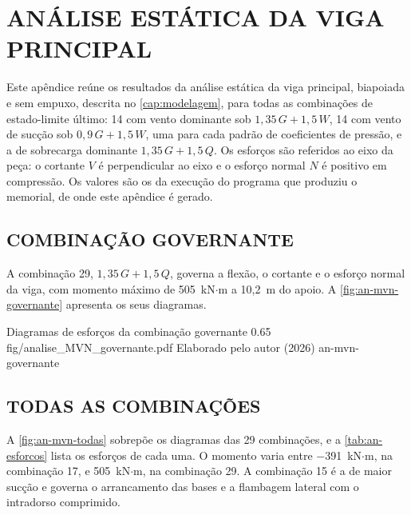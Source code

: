 
\chapter{ANÁLISE ESTÁTICA DA VIGA PRINCIPAL}\label{ap:analise-estatica}

Este apêndice reúne os resultados da análise estática da viga principal, biapoiada e sem empuxo, descrita no \autoref{cap:modelagem}, para todas as combinações de estado-limite último: 14 com vento dominante sob $1{,}35\,G + 1{,}5\,W$, 14 com vento de sucção sob $0{,}9\,G + 1{,}5\,W$, uma para cada padrão de coeficientes de pressão, e a de sobrecarga dominante $1{,}35\,G + 1{,}5\,Q$. Os esforços são referidos ao eixo da peça: o cortante $V$ é perpendicular ao eixo e o esforço normal $N$ é positivo em compressão. Os valores são os da execução do programa que produziu o memorial, de onde este apêndice é gerado.

\section{COMBINAÇÃO GOVERNANTE}\label{sec:an-governante}

A combinação 29, $1{,}35\,G + 1{,}5\,Q$, governa a flexão, o cortante e o esforço normal da viga, com momento máximo de 505~kN$\cdot$m a 10,2~m do apoio. A \autoref{fig:an-mvn-governante} apresenta os seus diagramas.

\figura
{Diagramas de esforços da combinação governante}
{0.65}
{fig/analise_MVN_governante.pdf}
{Elaborado pelo autor (2026)}
{an-mvn-governante}
{}
{}

\section{TODAS AS COMBINAÇÕES}\label{sec:an-todas}

A \autoref{fig:an-mvn-todas} sobrepõe os diagramas das 29 combinações, e a \autoref{tab:an-esforcos} lista os esforços de cada uma. O momento varia entre $-$391~kN$\cdot$m, na combinação 17, e 505~kN$\cdot$m, na combinação 29. A combinação 15 é a de maior sucção e governa o arrancamento das bases e a flambagem lateral com o intradorso comprimido.

